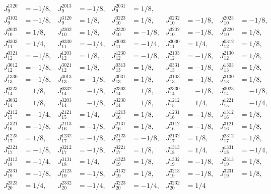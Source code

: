 \documentclass[a4paper,12pt, DIV=14, BCOR=5mm, twoside, headsepline]{scrbook}
\begin{document}
\begin{align}
\begin{alignedat}{5}
J_{9}^{1320} &= -1/8, & 
J_{9}^{2013} &= -1/8, &
J_{9}^{2031} &= 1/8, \\ 
J_{9}^{3102} &= -1/8, & 
J_{9}^{3120} &= 1/8, & 
J_{10}^{0223} &= 1/8, & 
J_{10}^{0232} &= -1/8, &
J_{10}^{2023} &= -1/8, \\ 
J_{10}^{2032} &= 1/8, & 
J_{10}^{2302} &= 1/8, & 
J_{10}^{2320} &= -1/8, & 
J_{10}^{3202} &= -1/8, & 
J_{10}^{3220} &= 1/8, \\ 
J_{11}^{0303} &= 1/4, & 
J_{11}^{0330} &= -1/4, & 
J_{11}^{3003} &= -1/4, & 
J_{11}^{3030} &= 1/4, & 
J_{12}^{0312} &= 1/8, \\ 
J_{12}^{0321} &= -1/8, & 
J_{12}^{1203} &= 1/8, & 
J_{12}^{1230} &= -1/8, & 
J_{12}^{2103} &= -1/8, & 
J_{12}^{2130} &= 1/8, \\ 
J_{12}^{3012} &= -1/8, & 
J_{12}^{3021} &= 1/8, & 
J_{13}^{0313} &= 1/8, & 
J_{13}^{0331} &= -1/8, & 
J_{13}^{1303} &= 1/8, \\ 
J_{13}^{1330} &= -1/8, & 
J_{13}^{3013} &= -1/8, & 
J_{13}^{3031} &= 1/8, & 
J_{13}^{3103} &= -1/8, & 
J_{13}^{3130} &= 1/8, \\ 
J_{14}^{0323} &= 1/8, & 
J_{14}^{0332} &= -1/8, & 
J_{14}^{2303} &= 1/8, & 
J_{14}^{2330} &= -1/8, & 
J_{14}^{3023} &= -1/8, \\ 
J_{14}^{3032} &= 1/8, & 
J_{14}^{3203} &= -1/8, & 
J_{14}^{3230} &= 1/8, & 
J_{15}^{1212} &= 1/4, & 
J_{15}^{1221} &= -1/4, \\ 
J_{15}^{2112} &= -1/4, & 
J_{15}^{2121} &= 1/4, & 
J_{16}^{1213} &= 1/8, & 
J_{16}^{1231} &= -1/8, & 
J_{16}^{1312} &= 1/8, \\ 
J_{16}^{1321} &= -1/8, & 
J_{16}^{2113} &= -1/8, & 
J_{16}^{2131} &= 1/8, & 
J_{16}^{3112} &= -1/8, & 
J_{16}^{3121} &= 1/8, \\ 
J_{17}^{1223} &= 1/8, & 
J_{17}^{1232} &= -1/8, & 
J_{17}^{2123} &= -1/8, & 
J_{17}^{2132} &= 1/8, & 
J_{17}^{2312} &= 1/8, \\ 
J_{17}^{2321} &= -1/8, & 
J_{17}^{3212} &= -1/8, & 
J_{17}^{3221} &= 1/8, & 
J_{18}^{1313} &= 1/4, & 
J_{18}^{1331} &= -1/4, \\ 
J_{18}^{3113} &= -1/4, & 
J_{18}^{3131} &= 1/4, & 
J_{19}^{1323} &= 1/8, & 
J_{19}^{1332} &= -1/8, & 
J_{19}^{2313} &= 1/8, \\ 
J_{19}^{2331} &= -1/8, & 
J_{19}^{3123} &= -1/8, & 
J_{19}^{3132} &= 1/8, & 
J_{19}^{3213} &= -1/8, & 
J_{19}^{3231} &= 1/8, \\ 
J_{20}^{2323} &= 1/4, & 
J_{20}^{2332} &= -1/4, & 
J_{20}^{3223} &= -1/4, & 
J_{20}^{3232} &= 1/4  
    \end{alignedat}
\end{align}
\end{document}
